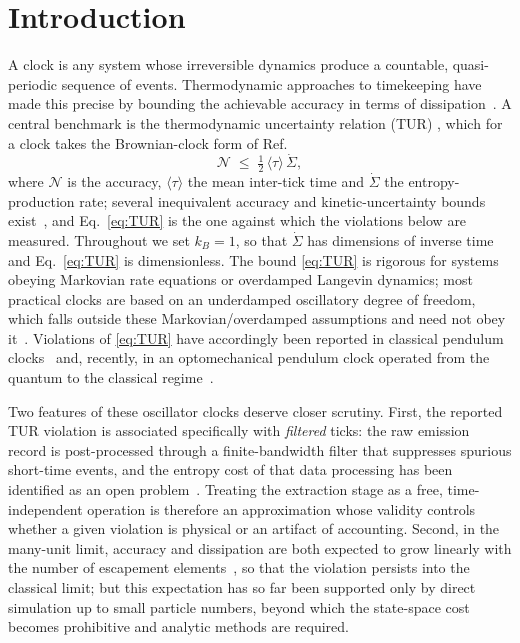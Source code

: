 \documentclass[aps,pre,reprint,amsmath,amssymb,floatfix,nofootinbib]{revtex4-2}
\newcommand{\avg}[1]{\langle #1 \rangle}
\newcommand{\Sdot}{\dot{\Sigma}}
\begin{document}
\section{Introduction}

A clock is any system whose irreversible dynamics produce a countable,
quasi-periodic sequence of events. Thermodynamic approaches to
timekeeping have made this precise by bounding the achievable accuracy in
terms of dissipation~\cite{BaratoSeifert2016,Erker2017,Milburn2020,Pearson2021,Meier2023,Prech2025}.
A central benchmark is the thermodynamic uncertainty relation (TUR)
\cite{BaratoSeifert2015,Gingrich2016,HorowitzGingrich2020}, which for a
clock takes the Brownian-clock form of Ref.~\cite{BaratoSeifert2016}
\begin{equation}
  \mathcal{N} \;\le\; \tfrac{1}{2}\,\avg{\tau}\,\Sdot ,
  \label{eq:TUR}
\end{equation}
where $\mathcal{N}$ is the accuracy, $\avg{\tau}$ the mean inter-tick
time and $\Sdot$ the entropy-production rate; several inequivalent
accuracy and kinetic-uncertainty bounds exist~\cite{Meier2023,Prech2025},
and Eq.~\eqref{eq:TUR} is the one against which the violations below are
measured. Throughout we set $k_B=1$, so that $\Sdot$ has dimensions of
inverse time and Eq.~\eqref{eq:TUR} is dimensionless. The bound
\eqref{eq:TUR} is rigorous for systems obeying Markovian rate equations
or overdamped Langevin dynamics; most practical clocks are based on
an underdamped oscillatory degree of freedom, which falls outside these
Markovian/overdamped assumptions and need not obey
it~\cite{Pietzonka2022,Gopal2024,Culhane2024,Scheer2024,Brunelli2026}.
Violations of \eqref{eq:TUR} have accordingly been reported in classical
pendulum clocks~\cite{Pietzonka2022,Gopal2024} and, recently, in an
optomechanical pendulum clock operated from the quantum to the classical
regime~\cite{Brunelli2026}.

Two features of these oscillator clocks deserve closer scrutiny. First,
the reported TUR violation is associated specifically with
\emph{filtered} ticks: the raw emission record is post-processed through a
finite-bandwidth filter that suppresses spurious short-time events, and
the entropy cost of that data processing has been identified as an open
problem~\cite{Brunelli2026,Wadhia2025}. Treating the extraction stage as
a free, time-independent operation is therefore an approximation whose
validity controls whether a given violation is physical or an artifact of
accounting. Second, in the many-unit limit, accuracy and dissipation are
both expected to grow linearly with the number of escapement
elements~\cite{Brunelli2026}, so that the violation persists into the
classical limit; but this expectation has so far been supported only by
direct simulation up to small particle numbers, beyond which the
state-space cost becomes prohibitive and analytic methods are required.
\end{document}

